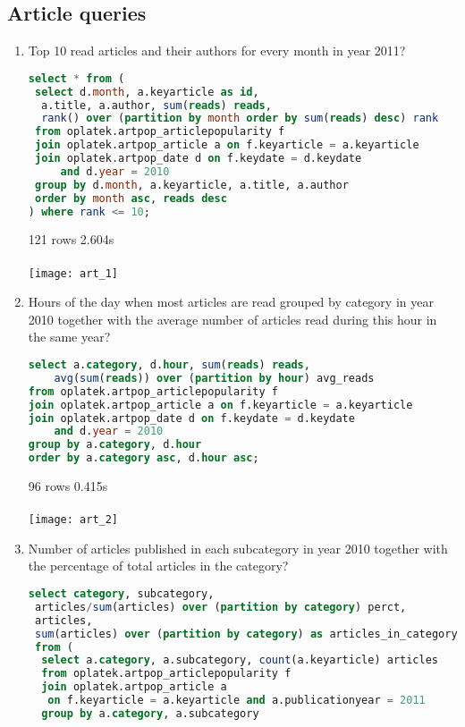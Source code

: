 \subsection*{Article queries} %
\label{sub:Article  queries}
\begin{enumerate}
\item    Top 10 read articles and their authors for every month in year 2011?
\begin{lstlisting}[language=sql] 
select * from (
 select d.month, a.keyarticle as id, 
  a.title, a.author, sum(reads) reads, 
  rank() over (partition by month order by sum(reads) desc) rank 
 from oplatek.artpop_articlepopularity f
 join oplatek.artpop_article a on f.keyarticle = a.keyarticle
 join oplatek.artpop_date d on f.keydate = d.keydate 
     and d.year = 2010
 group by d.month, a.keyarticle, a.title, a.author
 order by month asc, reads desc
) where rank <= 10;
\end{lstlisting}
     121 rows 2.604s \\ \\
      \texttt{[image: art\_1]}
\item    Hours of the day when most articles are read grouped by category in year 2010 together with the average number of articles read during this hour in the same year?
\begin{lstlisting}[language=sql] 
select a.category, d.hour, sum(reads) reads, 
    avg(sum(reads)) over (partition by hour) avg_reads 
from oplatek.artpop_articlepopularity f
join oplatek.artpop_article a on f.keyarticle = a.keyarticle
join oplatek.artpop_date d on f.keydate = d.keydate 
    and d.year = 2010
group by a.category, d.hour
order by a.category asc, d.hour asc;
\end{lstlisting}
     96 rows 0.415s \\ \\
      \texttt{[image: art\_2]}
\item    Number of articles published in each subcategory in year 2010 together with the percentage of total articles in the category?
\begin{lstlisting}[language=sql] 
select category, subcategory, 
 articles/sum(articles) over (partition by category) perct, 
 articles, 
 sum(articles) over (partition by category) as articles_in_category 
 from (
  select a.category, a.subcategory, count(a.keyarticle) articles
  from oplatek.artpop_articlepopularity f
  join oplatek.artpop_article a 
   on f.keyarticle = a.keyarticle and a.publicationyear = 2011
  group by a.category, a.subcategory

\end{lstlisting}
\end{enumerate}
